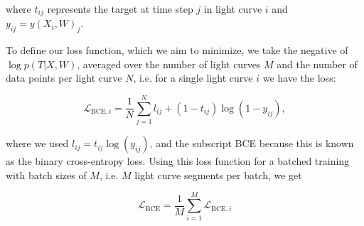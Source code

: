 \noindent where $t_{ij}$ represents the target at time step $j$ in light curve $i$ and $y_{ij} = y(X_i,W)_j$.

To define our loss function, which we aim to minimize, we take the negative of $\log p(T|X,W)$, averaged over the number of light curves $M$ and the number of data points per light curve $N$, i.e. for a single light curve $i$ we have the loss:

\begin{equation}
    \mathcal{L}_{\text{BCE},i} = \frac{1}{N}\sum^{N}_{j=1} l_{ij} + (1 - t_{ij}) \log (1 - y_{ij}),
\end{equation}

\noindent where we used $l_{ij} = t_{ij} \log( y_{ij})$, and the subscript BCE because this is known as the binary cross-entropy loss.
Using this loss function for a batched training with batch sizes of $M$, i.e. $M$ light curve segments per batch, we get

\begin{equation}
    \mathcal{L}_{\text{BCE}} = \frac{1}{M} \sum_{i=1}^M \mathcal{L}_{\text{BCE},i}
\end{equation}

